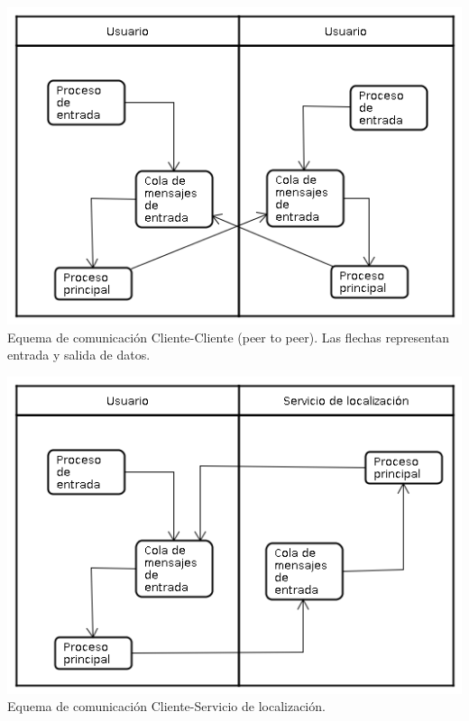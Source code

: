 \begin{center}
\small\includegraphics[scale=0.65]{./Images/ArquitecturaClienteConCliente} \\ 
\caption{Equema de comunicación Cliente-Cliente (peer to peer). Las flechas representan entrada y salida de datos. }
\end{center}

\begin{center}
\small\includegraphics[scale=0.65]{./Images/ArquitecturaClienteConServidor} \\
\caption{Equema de comunicación Cliente-Servicio de localización.} 
\end{center}

